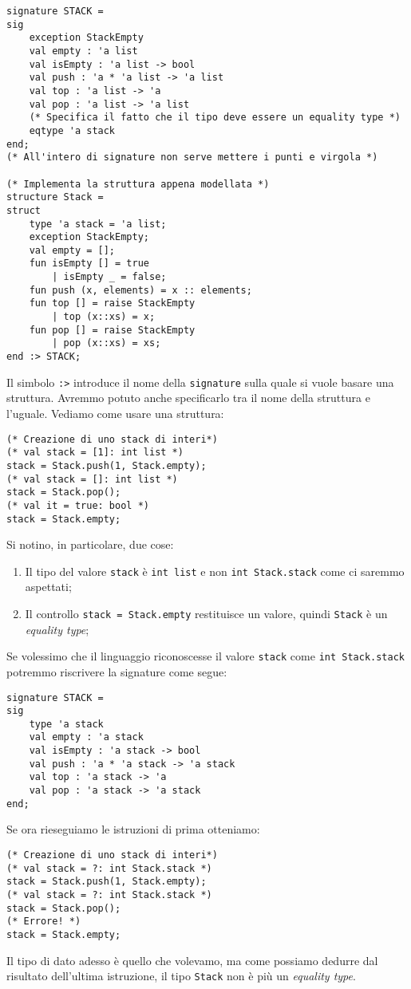 \documentclass[12pt, a4paper]{report}
\theoremstyle{definition}
\newcommand{\code}[1]{\texttt{#1}}
\begin{document}
\begin{lstlisting}
signature STACK =
sig
    exception StackEmpty
    val empty : 'a list
    val isEmpty : 'a list -> bool
    val push : 'a * 'a list -> 'a list
    val top : 'a list -> 'a
    val pop : 'a list -> 'a list
    (* Specifica il fatto che il tipo deve essere un equality type *)
    eqtype 'a stack
end;
(* All'intero di signature non serve mettere i punti e virgola *)

(* Implementa la struttura appena modellata *)
structure Stack =
struct
    type 'a stack = 'a list;
    exception StackEmpty;
    val empty = [];
    fun isEmpty [] = true
        | isEmpty _ = false;
    fun push (x, elements) = x :: elements;
    fun top [] = raise StackEmpty
        | top (x::xs) = x;
    fun pop [] = raise StackEmpty
        | pop (x::xs) = xs;
end :> STACK;
\end{lstlisting}
Il simbolo \code{:>} introduce il nome della \code{signature} sulla quale si
vuole basare una struttura. Avremmo potuto anche specificarlo tra il nome della
struttura e l'uguale. Vediamo come usare una struttura:

\begin{lstlisting}
(* Creazione di uno stack di interi*)
(* val stack = [1]: int list *)
stack = Stack.push(1, Stack.empty);
(* val stack = []: int list *)
stack = Stack.pop();
(* val it = true: bool *)
stack = Stack.empty;
\end{lstlisting}
Si notino, in particolare, due cose:
\begin{enumerate}[label=(\roman*)]
    \item Il tipo del valore \code{stack} è \code{int list} e non \code{int Stack.stack}
    come ci saremmo aspettati;
    \item Il controllo \code{stack = Stack.empty} restituisce un valore, quindi
    \code{Stack} è un \emph{equality type};
\end{enumerate}
Se volessimo che il linguaggio riconoscesse il valore \code{stack} come 
\code{int Stack.stack} potremmo riscrivere la signature come segue:
\begin{lstlisting}
signature STACK =
sig
    type 'a stack
    val empty : 'a stack
    val isEmpty : 'a stack -> bool
    val push : 'a * 'a stack -> 'a stack
    val top : 'a stack -> 'a
    val pop : 'a stack -> 'a stack
end;
\end{lstlisting}
Se ora rieseguiamo le istruzioni di prima otteniamo:
\begin{lstlisting}
(* Creazione di uno stack di interi*)
(* val stack = ?: int Stack.stack *)
stack = Stack.push(1, Stack.empty);
(* val stack = ?: int Stack.stack *)
stack = Stack.pop();
(* Errore! *)
stack = Stack.empty;
\end{lstlisting}
Il tipo di dato adesso è quello che volevamo, ma come possiamo dedurre dal
risultato dell'ultima istruzione, il tipo \code{Stack} non è più un \emph{equality
type}.
\end{document}
